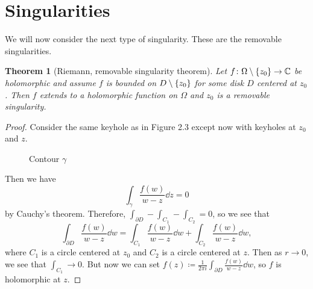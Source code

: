 \documentclass[leqno, openany]{memoir}
\newtheorem{thm}{Theorem}[section]
\theoremstyle{definition}
\theoremstyle{remark}
\theoremstyle{plain}
\theoremstyle{definition}
\theoremstyle{remark}
\newcommand{\C}{\mathbb{C}}
\begin{document}
\section{Singularities}%
\label{sec:singularities}

We will now consider the next type of singularity. These are the removable singularities.

\begin{thm}[Riemann, removable singularity theorem]
    Let $f \colon \Omega \setminus \qty{z_0} \to \C$ be holomorphic and assume $f$ is bounded on $D \setminus \qty{z_0}$ for some disk $D$ centered at $z_0$. Then $f$ extends to a holomorphic function on $\Omega$ and $z_0$ is a removable singularity.
\end{thm}

\begin{proof}
    Consider the same keyhole as in Figure 2.3 except now with keyholes at $z_0$ and $z$. 
\begin{figure}[H]
\begin{center}
\end{center}
\caption{Contour $\gamma$}%
\label{fig:contour-4}
\end{figure}
    Then we have
    \[ \int_{\gamma} \frac{f(w)}{w-z} \dd{z} = 0 \]
    by Cauchy's theorem. Therefore, $\int_{\partial D} - \int_{C_1} - \int_{C_2} = 0$, so we see that
    \[ \int_{\partial D} \frac{f(w)}{w-z} \dd{w} = \int_{C_1} \frac{f(w)}{w-z} \dd{w} + \int_{C_2} \frac{f(w)}{w-z} \dd{w}, \]
    where $C_1$ is a circle centered at $z_0$ and $C_2$ is a circle centered at $z$. Then as $r \to 0$, we see that $\int_{C_1} \to 0$. But now we can set $f(z) \coloneqq \frac{1}{2 \pi i} \int_{\partial D} \frac{f(w)}{w-z} \dd{w}$, so $f$ is holomorphic at $z$.
\end{proof}
\end{document}
